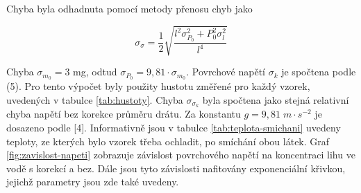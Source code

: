 Chyba byla odhadnuta pomocí metody přenosu chyb jako

\begin{equation}
    \sigma_{\sigma} = \frac{1}{2}\sqrt{\frac{l^2 \sigma^2_{P_0}+P^2_0 \sigma^2_l}{l^4}}
\end{equation}

Chyba $\sigma_{m_0} = 3 $ mg, odtud $\sigma_{P_0} = 9,81 \cdot \sigma_{m_0}$. Povrchové napětí $\sigma_k$ je spočtena podle (5). Pro tento výpočet byly použity hustotu změřené pro každý vzorek, uvedených v tabulce \ref{tab:hustoty}. Chyba $\sigma_{\sigma_k}$ byla spočtena jako stejná relativní chyba napětí bez korekce průměru drátu. Za konstantu $g = 9,81 \; m \cdot s^{-2}$ je dosazeno podle [4]. Informativně jsou v tabulce \ref{tab:teplota-smichani} uvedeny teploty, ze kterých bylo vzorek třeba ochladit, po smíchání obou látek. Graf \ref{fig:zavislost-napeti} zobrazuje závislost povrchového napětí na koncentraci lihu ve vodě s korekcí a bez. Dále jsou tyto závislosti nafitovány exponenciální křivkou, jejichž parametry jsou zde také uvedeny.

